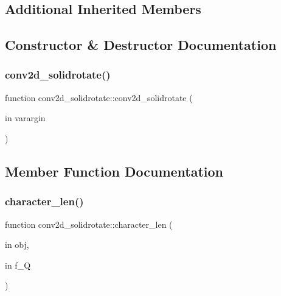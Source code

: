 \subsection*{Additional Inherited Members}


\subsection{Constructor \& Destructor Documentation}
\mbox{\label{classconv2d__solidrotate_ac99907b077d8efb99c98b99eadb33282}} 
\subsubsection{\texorpdfstring{conv2d\+\_\+solidrotate()}{conv2d\_solidrotate()}}
{\footnotesize\ttfamily function conv2d\+\_\+solidrotate\+::conv2d\+\_\+solidrotate (\begin{DoxyParamCaption}\item[{in}]{varargin }\end{DoxyParamCaption})}



\subsection{Member Function Documentation}
\mbox{\label{classconv2d__solidrotate_a8d420c4ad2c355f51205e576cf2e158c}} 
\subsubsection{\texorpdfstring{character\+\_\+len()}{character\_len()}}
{\footnotesize\ttfamily function conv2d\+\_\+solidrotate\+::character\+\_\+len (\begin{DoxyParamCaption}\item[{in}]{obj,  }\item[{in}]{f\+\_\+Q }\end{DoxyParamCaption})\hspace{0.3cm}{\ttfamily [virtual]}}



